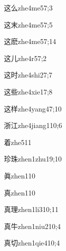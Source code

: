 \begin{verbete}{这么}{zhe4me5}{7;3}
\end{verbete}
\begin{verbete}{这末}{zhe4me5}{7;5}
\end{verbete}
\begin{verbete}{这麽}{zhe4me5}{7;14}
\end{verbete}
\begin{verbete}{这儿}{zhe4r5}{7;2}
\end{verbete}
\begin{verbete}{这时}{zhe4shi2}{7;7}
\end{verbete}
\begin{verbete}{这些}{zhe4xie1}{7;8}
\end{verbete}
\begin{verbete}{这样}{zhe4yang4}{7;10}
\end{verbete}
\begin{verbete}{浙江}{zhe4jiang1}{10;6}
\end{verbete}
\begin{verbete}{着}{zhe5}{11}
\end{verbete}
\begin{verbete}{珍珠}{zhen1zhu1}{9;10}
\end{verbete}
\begin{verbete}{眞}{zhen1}{10}
\end{verbete}
\begin{verbete}{真}{zhen1}{10}
\end{verbete}
\begin{verbete}{真理}{zhen1li3}{10;11}
\end{verbete}
\begin{verbete}{真牛}{zhen1niu2}{10;4}
\end{verbete}
\begin{verbete}{真切}{zhen1qie4}{10;4}
\end{verbete}
